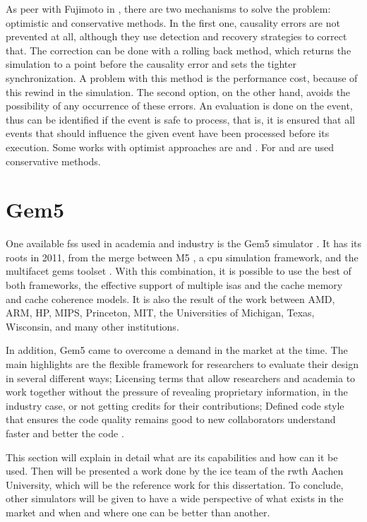 As peer with Fujimoto in \cite{PDESfujimoto}, there are two mechanisms to solve the problem: optimistic and conservative methods. In the first one, causality errors are not prevented at all, although they use detection and recovery strategies to correct that. The correction can be done with a rolling back method, which returns the simulation to a point before the causality error and sets the tighter synchronization. A problem with this method is the performance cost, because of this rewind in the simulation. The second option, on the other hand, avoids the possibility of any occurrence of these errors. An evaluation is done on the event, thus can be identified if the event is safe to process, that is, it is ensured that all events that should influence the given event have been processed before its execution. Some works with optimist approaches are \cite{busnot2020standard} and \cite{optimist2}. For \cite{dist-gem5} and \cite{asynchronousSimulator} are used conservative methods.

\section{Gem5}

One available \gls{fss} used in academia and industry is the Gem5 simulator \cite{TheGem5Simulator}\cite{Thegem5simulatorV2}. It has its roots in 2011, from the merge between M5 \cite{TheM5Simulator}, a \gls{cpu} simulation framework, and the multifacet \gls{gems} toolset \cite{TheGEMS}. With this combination, it is possible to use the best of both frameworks, the effective support of multiple \glspl{isa} and the cache memory and cache coherence models. It is also the result of the work between AMD, ARM, HP, MIPS, Princeton, MIT, the Universities of Michigan, Texas, Wisconsin, and many other institutions.

In addition, Gem5 came to overcome a demand in the market at the time. The main highlights are the flexible framework for researchers to evaluate their design in several different ways; Licensing terms that allow researchers and academia to work together without the pressure of revealing proprietary information, in the industry case, or not getting credits for their contributions; Defined code style that ensures the code quality remains good to new collaborators understand faster and better the code \cite{TheGem5Simulator}. 

This section will explain in detail what are its capabilities and how can it be used. Then will be presented a work done by the \gls{ice} team of the \gls{rwth} Aachen University, which will be the reference work for this dissertation. To conclude, other simulators will be given to have a wide perspective of what exists in the market and when and where one can be better than another. 

